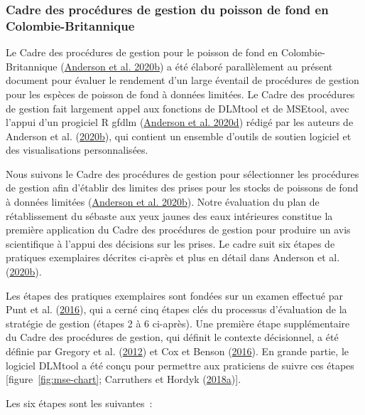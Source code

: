 \documentclass[french,11pt]{book}
\begin{document}
\hypertarget{sec:introduction-mp-framework}{%
\subsubsection{Cadre des procédures de gestion du poisson de fond en Colombie-Britannique}\label{sec:introduction-mp-framework}}

Le Cadre des procédures de gestion pour le poisson de fond en Colombie-Britannique (\protect\hyperlink{ref-anderson2020gfmp}{Anderson et al. 2020b}) a été élaboré parallèlement au présent document pour évaluer le rendement d'un large éventail de procédures de gestion pour les espèces de poisson de fond à données limitées. Le Cadre des procédures de gestion fait largement appel aux fonctions de DLMtool et de MSEtool, avec l'appui d'un progiciel R gfdlm (\protect\hyperlink{ref-gfdlm}{Anderson et al. 2020d}) rédigé par les auteurs de Anderson et al. (\protect\hyperlink{ref-anderson2020gfmp}{2020b}), qui contient un ensemble d'outils de soutien logiciel et des visualisations personnalisées.

Nous suivons le Cadre des procédures de gestion pour sélectionner les procédures de gestion afin d'établir des limites des prises pour les stocks de poissons de fond à données limitées (\protect\hyperlink{ref-anderson2020gfmp}{Anderson et al. 2020b}). Notre évaluation du plan de rétablissement du sébaste aux yeux jaunes des eaux intérieures constitue la première application du Cadre des procédures de gestion pour produire un avis scientifique à l'appui des décisions sur les prises. Le cadre suit six étapes de pratiques exemplaires décrites ci-après et plus en détail dans Anderson et al. (\protect\hyperlink{ref-anderson2020gfmp}{2020b}).

Les étapes des pratiques exemplaires sont fondées sur un examen effectué par Punt et al. (\protect\hyperlink{ref-punt2016}{2016}), qui a cerné cinq étapes clés du processus d'évaluation de la stratégie de gestion (étapes 2 à 6 ci-après). Une première étape supplémentaire du Cadre des procédures de gestion, qui définit le contexte décisionnel, a été définie par Gregory et al. (\protect\hyperlink{ref-gregory2012}{2012}) et Cox et Benson (\protect\hyperlink{ref-cox2016}{2016}). En grande partie, le logiciel DLMtool a été conçu pour permettre aux praticiens de suivre ces étapes {[}figure~\ref{fig:mse-chart}; Carruthers et Hordyk (\protect\hyperlink{ref-carruthers2018}{2018a}){]}.



Les six étapes sont les suivantes~:
\end{document}

